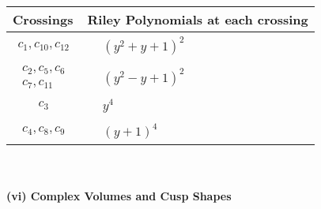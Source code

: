 \documentclass[1p]{elsarticle_modified}
\theoremstyle{definition}
\begin{document}
\begin{tabular}{m{50pt}|m{274pt}}
Crossings & \hspace{64pt}Riley Polynomials at each crossing \\
\hline $$\begin{aligned}c_{1},c_{10},c_{12}\end{aligned}$$&$\begin{aligned}
&(y^2+y+1)^2
\end{aligned}$\\
\hline $$\begin{aligned}c_{2},c_{5},c_{6}\\c_{7},c_{11}\end{aligned}$$&$\begin{aligned}
&(y^2- y+1)^2
\end{aligned}$\\
\hline $$\begin{aligned}c_{3}\end{aligned}$$&$\begin{aligned}
&y^4
\end{aligned}$\\
\hline $$\begin{aligned}c_{4},c_{8},c_{9}\end{aligned}$$&$\begin{aligned}
&(y+1)^4
\end{aligned}$\\
\hline
\end{tabular}\\~\\
\newpage\flushleft \textbf{(vi) Complex Volumes and Cusp Shapes}
\end{document}
